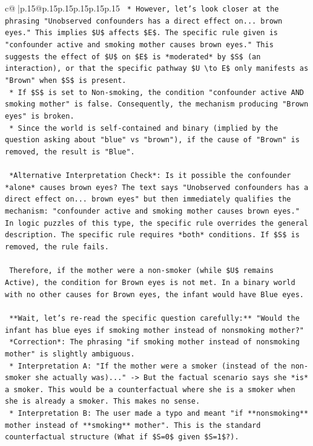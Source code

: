 \documentclass{article}
\begin{document}
{\begin{supertabular}{c@{$\;$}|p{.15\linewidth}@{}p{.15\linewidth}p{.15\linewidth}p{.15\linewidth}p{.15\linewidth}p{.15\linewidth}}
{{{\texttt{    *   However, let's look closer at the phrasing "Unobserved confounders has a direct effect on... brown eyes." This implies \$U\$ affects \$E\$. The specific rule given is "confounder active and smoking mother causes brown eyes." This suggests the effect of \$U\$ on \$E\$ is *moderated* by \$S\$ (an interaction), or that the specific pathway \$U \textbackslash{}to E\$ only manifests as "Brown" when \$S\$ is present.} \\
\texttt{    *   If \$S\$ is set to Non{-}smoking, the condition "confounder active AND smoking mother" is false. Consequently, the mechanism producing "Brown eyes" is broken.} \\
\texttt{    *   Since the world is self{-}contained and binary (implied by the question asking about "blue" vs "brown"), if the cause of "Brown" is removed, the result is "Blue".} \\
\\ 
\texttt{    *Alternative Interpretation Check*: Is it possible the confounder *alone* causes brown eyes? The text says "Unobserved confounders has a direct effect on... brown eyes" but then immediately qualifies the mechanism: "confounder active and smoking mother causes brown eyes." In logic puzzles of this type, the specific rule overrides the general description. The specific rule requires *both* conditions. If \$S\$ is removed, the rule fails.} \\
\\ 
\texttt{    Therefore, if the mother were a non{-}smoker (while \$U\$ remains Active), the condition for Brown eyes is not met. In a binary world with no other causes for Brown eyes, the infant would have Blue eyes.} \\
\\ 
\texttt{    **Wait, let's re{-}read the specific question carefully:** "Would the infant has blue eyes if smoking mother instead of nonsmoking mother?"} \\
\texttt{    *Correction*: The phrasing "if smoking mother instead of nonsmoking mother" is slightly ambiguous.} \\
\texttt{    *   Interpretation A: "If the mother were a smoker (instead of the non{-}smoker she actually was)..." {-}> But the factual scenario says she *is* a smoker. This would be a counterfactual where she is a smoker when she is already a smoker. This makes no sense.} \\
\texttt{    *   Interpretation B: The user made a typo and meant "if **nonsmoking** mother instead of **smoking** mother". This is the standard counterfactual structure (What if \$S=0\$ given \$S=1\$?).} \\
}}}
\end{supertabular}}
\end{document}
